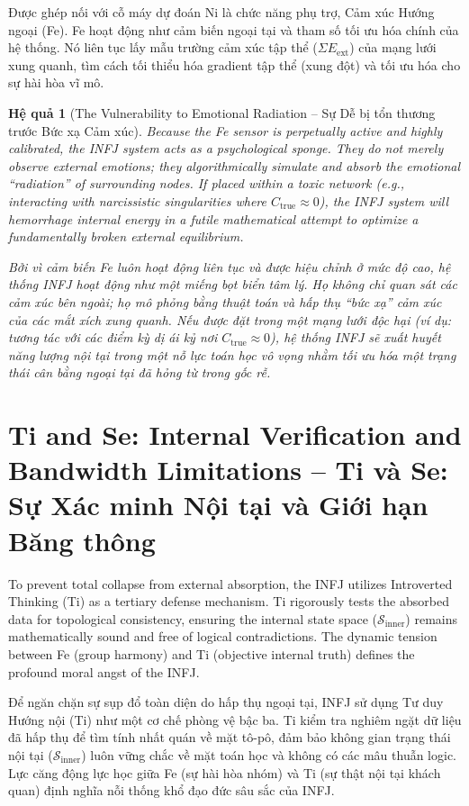 \documentclass{report}
\newtheorem{hequa}{Hệ quả}
\begin{document}
Được ghép nối với cỗ máy dự đoán Ni là chức năng phụ trợ, Cảm xúc Hướng ngoại (Fe). Fe hoạt động như cảm biến ngoại tại và tham số tối ưu hóa chính của hệ thống. Nó liên tục lấy mẫu trường cảm xúc tập thể ($\Sigma E_{\text{ext}}$) của mạng lưới xung quanh, tìm cách tối thiểu hóa gradient tập thể (xung đột) và tối ưu hóa cho sự hài hòa vĩ mô.

\begin{hequa}[The Vulnerability to Emotional Radiation -- Sự Dễ bị tổn thương trước Bức xạ Cảm xúc]
	Because the Fe sensor is perpetually active and highly calibrated, the INFJ system acts as a psychological sponge. They do not merely observe external emotions; they algorithmically simulate and absorb the emotional ``radiation'' of surrounding nodes. If placed within a toxic network (e.g., interacting with narcissistic singularities where $C_{\text{true}} \approx 0$), the INFJ system will hemorrhage internal energy in a futile mathematical attempt to optimize a fundamentally broken external equilibrium.
	
	Bởi vì cảm biến Fe luôn hoạt động liên tục và được hiệu chỉnh ở mức độ cao, hệ thống INFJ hoạt động như một miếng bọt biển tâm lý. Họ không chỉ quan sát các cảm xúc bên ngoài; họ mô phỏng bằng thuật toán và hấp thụ ``bức xạ'' cảm xúc của các mắt xích xung quanh. Nếu được đặt trong một mạng lưới độc hại (ví dụ: tương tác với các điểm kỳ dị ái kỷ nơi $C_{\text{true}} \approx 0$), hệ thống INFJ sẽ xuất huyết năng lượng nội tại trong một nỗ lực toán học vô vọng nhằm tối ưu hóa một trạng thái cân bằng ngoại tại đã hỏng từ trong gốc rễ.
\end{hequa}

\section{Ti and Se: Internal Verification and Bandwidth Limitations -- Ti và Se: Sự Xác minh Nội tại và Giới hạn Băng thông}

To prevent total collapse from external absorption, the INFJ utilizes Introverted Thinking (Ti) as a tertiary defense mechanism. Ti rigorously tests the absorbed data for topological consistency, ensuring the internal state space ($\mathcal{S}_{\text{inner}}$) remains mathematically sound and free of logical contradictions. The dynamic tension between Fe (group harmony) and Ti (objective internal truth) defines the profound moral angst of the INFJ.

Để ngăn chặn sự sụp đổ toàn diện do hấp thụ ngoại tại, INFJ sử dụng Tư duy Hướng nội (Ti) như một cơ chế phòng vệ bậc ba. Ti kiểm tra nghiêm ngặt dữ liệu đã hấp thụ để tìm tính nhất quán về mặt tô-pô, đảm bảo không gian trạng thái nội tại ($\mathcal{S}_{\text{inner}}$) luôn vững chắc về mặt toán học và không có các mâu thuẫn logic. Lực căng động lực học giữa Fe (sự hài hòa nhóm) và Ti (sự thật nội tại khách quan) định nghĩa nỗi thống khổ đạo đức sâu sắc của INFJ.
\end{document}
